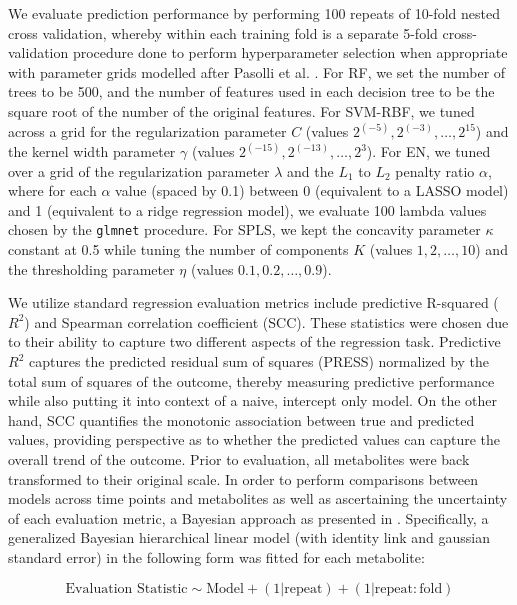 We evaluate prediction performance by performing 100 repeats of 10-fold nested cross validation, whereby within each training fold is a separate 5-fold cross-validation procedure done to perform hyperparameter selection when appropriate with parameter grids modelled after Pasolli et al. \cite{pasolli2016machine}. For RF, we set the number of trees to be 500, and the number of features used in each decision tree to be the square root of the number of the original features. For SVM-RBF, we tuned across a grid for the regularization parameter $C$ (values $2^{(-5)},2^{(-3)},\ldots,2^{15}$) and the kernel width parameter $\gamma$ (values $2^{(-15)},2^{(-13)},\ldots,2^{3}$). For EN, we tuned over a grid of the regularization parameter $\lambda$ and the $L_1$ to $L_2$ penalty ratio $\alpha$, where for each $\alpha$ value (spaced by 0.1) between 0 (equivalent to a LASSO model) and 1 (equivalent to a ridge regression model), we evaluate 100 lambda values chosen by the \texttt{glmnet} procedure. For SPLS, we kept the concavity parameter $\kappa$ constant at 0.5 while tuning the number of components $K$ (values $1,2,\ldots,10$) and the thresholding parameter $\eta$ (values $0.1,0.2,\ldots,0.9$). 

We utilize standard regression evaluation metrics include predictive R-squared ($R^2$) and Spearman correlation coefficient (SCC). These statistics were chosen due to their ability to capture two different aspects of the regression task. Predictive $R^2$ captures the predicted residual sum of squares (PRESS) normalized by the total sum of squares of the outcome, thereby measuring predictive performance while also putting it into context of a naive, intercept only model. On the other hand, SCC quantifies the monotonic association between true and predicted values, providing perspective as to  whether the predicted values can capture the overall trend of the outcome. Prior to evaluation, all metabolites were back transformed to their original scale. In order to perform comparisons between models across time points and metabolites as well as ascertaining the uncertainty of each evaluation metric, a Bayesian approach as presented in \cite{benavoli2017time}. Specifically, a generalized Bayesian hierarchical linear model (with identity link and gaussian standard error) in the following form was fitted for each metabolite:

$$
\text{Evaluation Statistic} \sim \text{Model} + (1 | \text{repeat})+(1 | \text{repeat}:\text{fold})
$$

